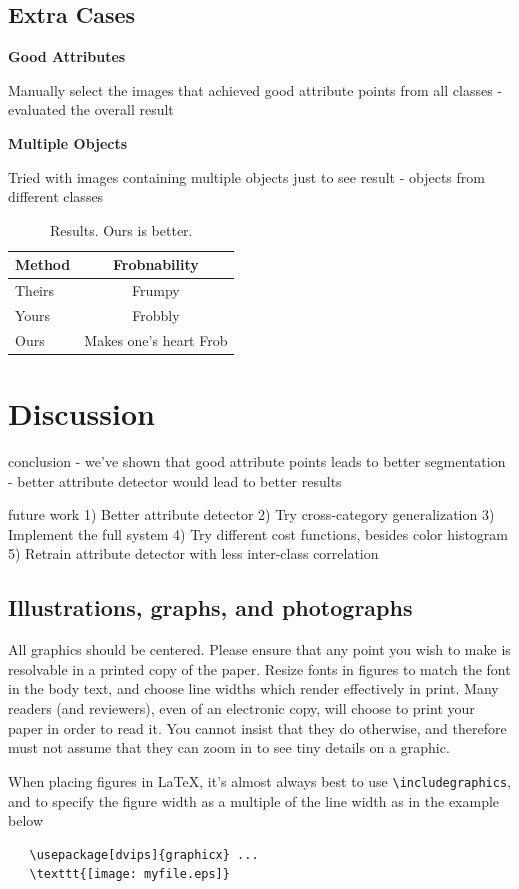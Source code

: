 \documentclass[10pt,twocolumn,letterpaper]{article}
\begin{document}
\subsection{Extra Cases}

\textbf{Good Attributes}

Manually select the images that achieved good attribute points from all classes
- evaluated the overall result


\textbf{Multiple Objects}

Tried with images containing multiple objects just to see result
- objects from different classes


\begin{table}
\begin{center}
\begin{tabular}{|l|c|}
\hline
Method & Frobnability \\
\hline\hline
Theirs & Frumpy \\
Yours & Frobbly \\
Ours & Makes one's heart Frob\\
\hline
\end{tabular}
\end{center}
\caption{Results.   Ours is better.}
\end{table}

\section{Discussion}

conclusion
- we've shown that good attribute points leads to better segmentation
- better attribute detector would lead to better results

future work
1) Better attribute detector
2) Try cross-category generalization
3) Implement the full system
4) Try different cost functions, besides color histogram
5) Retrain attribute detector with less inter-class correlation


\subsection{Illustrations, graphs, and photographs}

All graphics should be centered.  Please ensure that any point you wish to
make is resolvable in a printed copy of the paper.  Resize fonts in figures
to match the font in the body text, and choose line widths which render
effectively in print.  Many readers (and reviewers), even of an electronic
copy, will choose to print your paper in order to read it.  You cannot
insist that they do otherwise, and therefore must not assume that they can
zoom in to see tiny details on a graphic.

When placing figures in \LaTeX, it's almost always best to use
\verb+\includegraphics+, and to specify the  figure width as a multiple of
the line width as in the example below
{\small\begin{verbatim}
   \usepackage[dvips]{graphicx} ...
   \texttt{[image: myfile.eps]}
\end{verbatim}
}

{\small


}
\end{document}
